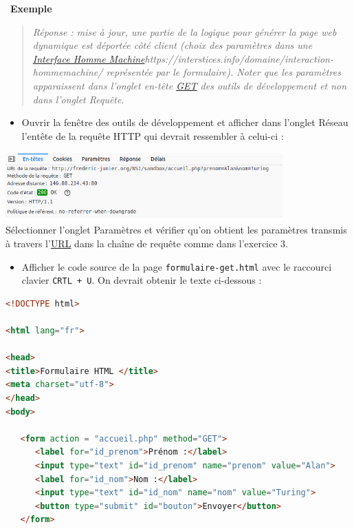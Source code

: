 \documentclass[
  11pt,
]{article}
\newcommand{\passthrough}[1]{#1}
\providecommand{\tightlist}{%
  \setlength{\itemsep}{0pt}\setlength{\parskip}{0pt}}
\newcounter{exple}
\newenvironment{exemple}[1]
{\par \medskip   \addtocounter{exple}{1} \noindent  
\begin{bclogo}[arrondi =0.1,   noborder = true, logo=\bclampe, marge=4]{~\textbf{Exemple} \textbf{\theexple} {\itshape #1} }  \par}
{
\end{bclogo}
 \par \bigskip }
\newcounter{logi}
\begin{document}
\begin{exemple}{}
\begin{enumerate}
  \begin{quote}
  \emph{Réponse : mise à jour, une partie de la logique pour générer la
  page web dynamique est déportée côté client (choix des paramètres dans
  une \href{}{Interface Homme
  Machine}https://interstices.info/domaine/interaction-hommemachine/
  représentée par le formulaire). Noter que les paramètres apparaissent
  dans l'onglet en-tête \url{GET} des outils de développement et non
  dans l'onglet Requête}.
  \end{quote}

  \begin{itemize}
  \tightlist
  \item
    Ouvrir la fenêtre des outils de développement et afficher dans
    l'onglet Réseau l'entête de la requête HTTP qui devrait ressembler à
    celui-ci :
  \end{itemize}

  \includegraphics[width=0.8\textwidth,height=\textheight]{images/entete-get.png}\\

  Sélectionner l'onglet Paramètres et vérifier qu'on obtient les
  paramètres transmis à travers
  l'\href{https://developer.mozilla.org/fr/docs/Glossaire/URL}{URL} dans
  la chaîne de requête comme dans l'exercice 3.

  \begin{itemize}
  \tightlist
  \item
    Afficher le code source de la page
    \passthrough{\lstinline!formulaire-get.html!} avec le raccourci
    clavier \passthrough{\lstinline!CRTL + U!}. On devrait obtenir le
    texte ci-dessous :
  \end{itemize}

\begin{lstlisting}[language=HTML]
<!DOCTYPE html>

<html lang="fr">

<head>
<title>Formulaire HTML </title>
<meta charset="utf-8">    
</head> 
<body>

   <form action = "accueil.php" method="GET">        
      <label for="id_prenom">Prénom :</label>
      <input type="text" id="id_prenom" name="prenom" value="Alan">
      <label for="id_nom">Nom :</label>
      <input type="text" id="id_nom" name="nom" value="Turing">
      <button type="submit" id="bouton">Envoyer</button>
   </form>


\end{lstlisting}
\end{enumerate}
\end{exemple}
\end{document}
